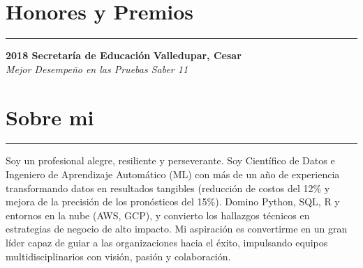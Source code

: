 \documentclass[9pt,a4paper]{article}
\newcommand{\cvevent}[4]{%
  {\noindent \textbf{#1 #2} \hfill \textbf{#3}\\%
   \textit{#4}\\[0pt]}%
}
\begin{document}
\section*{Honores y Premios}
\vspace{-\baselineskip}
\vspace{-\baselineskip}

\noindent\rule{\linewidth}{0.5pt}

\cvevent{2018}{Secretaría de Educación}{Valledupar, Cesar}{Mejor Desempeño en las Pruebas Saber 11}
\vspace{-\baselineskip}
\vspace{-\baselineskip}
\vspace{-\baselineskip}


\section*{Sobre mi}
\vspace{-\baselineskip}
\vspace{-\baselineskip}
\noindent\rule{\linewidth}{0.5pt}
Soy un profesional alegre, resiliente y perseverante. Soy Científico de Datos e Ingeniero de Aprendizaje Automático (ML) con más de un año de experiencia transformando datos en resultados tangibles (reducción de costos del 12\% y mejora de la precisión de los pronósticos del 15\%). Domino Python, SQL, R y entornos en la nube (AWS, GCP), y convierto los hallazgos técnicos en estrategias de negocio de alto impacto. Mi aspiración es convertirme en un gran líder capaz de guiar a las organizaciones hacia el éxito, impulsando equipos multidisciplinarios con visión, pasión y colaboración.
\end{document}
